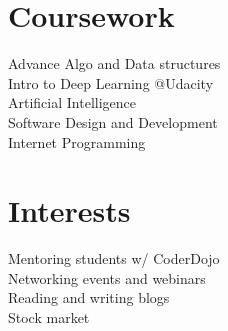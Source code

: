 \documentclass[]{rinkal_resume}
\begin{document}
\begin{minipage}[t]{0.30\textwidth}
\section{Coursework}
\textbullet{} Advance Algo and Data structures \\
\textbullet{} Intro to Deep Learning @Udacity\\
\textbullet{} Artificial Intelligence \\
\textbullet{} Software Design and Development \\
\textbullet{} Internet Programming \\
\smallsectionsep

\section{Interests}
\textbullet{} Mentoring students w/ CoderDojo \\
\textbullet{} Networking events and webinars \\
\textbullet{} Reading and writing blogs \\
\textbullet{} Stock market \\
%
%

\end{minipage} 
\hfill
\end{document}

